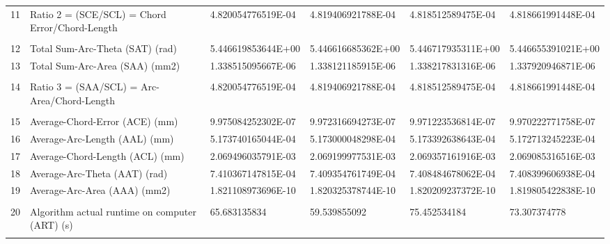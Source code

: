 \begin{landscape}
\begin{table}[ht]
{\begin{tabular}{ p{0.2cm} p{8.80cm} p{4.00cm} p{4.0cm} p{4.00cm} p{4.0cm}}
	11	&	Ratio 2 = (SCE/SCL) = Chord Error/Chord-Length	&	4.820054776519E-04	&	4.819406921788E-04	&	4.818512589475E-04	&	4.818661991448E-04	\\
	&		&		&		&		&		\\
	12	&	Total Sum-Arc-Theta (SAT) (rad)	&	5.446619853644E+00	&	5.446616685362E+00	&	5.446717935311E+00	&	5.446655391021E+00	\\
	13	&	Total Sum-Arc-Area (SAA) (mm2)	&	1.338515095667E-06	&	1.338121185915E-06	&	1.338217831316E-06	&	1.337920946871E-06	\\
	&		&		&		&		&		\\
	14	&	Ratio 3 = (SAA/SCL) = Arc-Area/Chord-Length	&	4.820054776519E-04	&	4.819406921788E-04	&	4.818512589475E-04	&	4.818661991448E-04	\\
	&		&		&		&		&		\\
	15	&	Average-Chord-Error (ACE) (mm)	&	9.975084252302E-07	&	9.972316694273E-07	&	9.971223536814E-07	&	9.970222771758E-07	\\
	16	&	Average-Arc-Length (AAL) (mm)	&	5.173740165044E-04	&	5.173000048298E-04	&	5.173392638643E-04	&	5.172713245223E-04	\\
	17	&	Average-Chord-Length (ACL) (mm)	&	2.069496035791E-03	&	2.069199977531E-03	&	2.069357161916E-03	&	2.069085316516E-03	\\
	18	&	Average-Arc-Theta (AAT) (rad)	&	7.410367147815E-04	&	7.409354761749E-04	&	7.408484678062E-04	&	7.408399606938E-04	\\
	19	&	Average-Arc-Area (AAA) (mm2)	&	1.821108973696E-10	&	1.820325378744E-10	&	1.820209237372E-10	&	1.819805422838E-10	\\
	&		&		&		&		&		\\
	20	&	Algorithm actual runtime on computer (ART) (s) 	&	65.683135834	&	59.539855092	&	75.452534184	&	73.307374778	\\
	&		&		&		&		&	\\	
	\hline
\end{tabular}

			
}   %
		
\end{table}
\end{landscape}

\clearpage
\pagebreak
